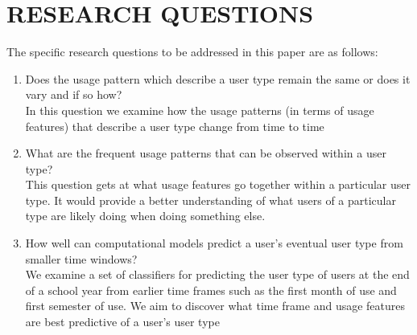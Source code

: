 \documentclass{acm_proc_article-sp}
\begin{document}
\section{RESEARCH QUESTIONS}
The specific research questions to be addressed in this paper are as follows:
\begin{enumerate}
\item Does the usage pattern which describe a user type remain the same or does it vary and if so how?
\\In this question we examine how the usage patterns (in terms of usage features) that describe a user type change from time to time
\item What are the frequent usage patterns that can be observed within a user type?
\\This question gets at what usage features go together within a particular user type. It would provide a better understanding of what users of a particular type are likely doing when doing something else.
\item How well can computational models predict a user's eventual user type from smaller time windows?
\\We examine a set of classifiers for predicting the user type of users at the end of a school year from earlier time frames such as
the first month of use and first semester of use. We aim to discover what time frame and usage features are best predictive of a user's user type
\end{enumerate}
\end{document}
